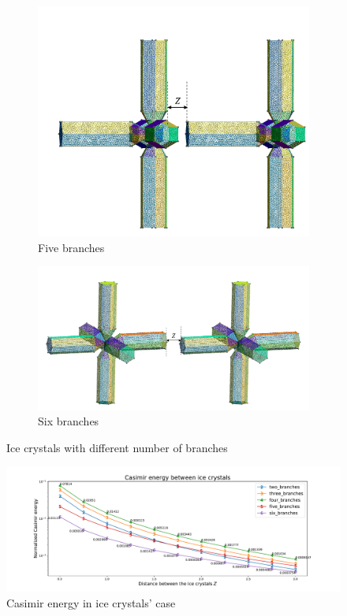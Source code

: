 \begin{figure}[H]
\begin{subfigure}{.5\linewidth}
    \includegraphics[scale = 0.4]{figures/5branches}
    \caption{Five branches}
    \end{subfigure}%
    \begin{subfigure}{.5\linewidth}
    \centering
    \includegraphics[scale = 0.4]{figures/6branches}
    \caption{Six branches}
    \end{subfigure}
    \caption{Ice crystals with different number of branches}
    \end{figure}

    \begin{figure}[H]
        \centering
        \hspace*{-1cm}\includegraphics[scale = 0.5]{figures/CasE_ice_crystals.pdf}
        \caption{Casimir energy in ice crystals' case}
    \end{figure}
    

